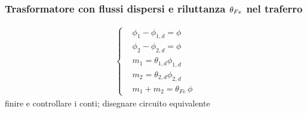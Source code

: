 \documentclass[letterpaper,10pt,italian]{jupyterBook}
\begin{document}
\subsubsection{Trasformatore con flussi dispersi e riluttanza \protect\(\theta_{Fe}\protect\) nel traferro}
\label{\detokenize{ch/circuits-electromagnetic-transformer:trasformatore-con-flussi-dispersi-e-riluttanza-theta-fe-nel-traferro}}\begin{equation*}
\begin{split}\begin{cases}
 & \phi_{1} - \phi_{1,d} = \phi \\
 & \phi_{2} - \phi_{2,d} = \phi \\
 & m_{1} = \theta_{1,d} \phi_{1,d} \\
 & m_{2} = \theta_{2,d} \phi_{2,d} \\
 & m_1   + m_{2} = \theta_{Fe} \, \phi
\end{cases}\end{split}
\end{equation*}
\sphinxAtStartPar
{} finire e controllare i conti; disegnare circuito equivalente



\sphinxstepscope
\end{document}
